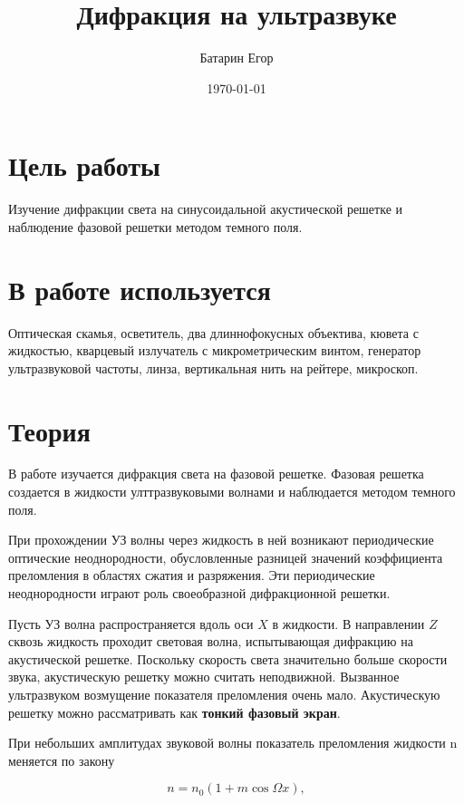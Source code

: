 \documentclass[a4paper,12pt]{article}
\author{Батарин Егор}
\title{Дифракция на ультразвуке}
\date{\today}
\begin{document}
 
\maketitle
 


\section{Цель работы} 

Изучение дифракции света на синусоидальной акустической решетке и наблюдение фазовой решетки методом темного поля. 

\section{В работе используется}

Оптическая скамья, осветитель, два длиннофокусных объектива, кювета с жидкостью, кварцевый излучатель с микрометрическим винтом, генератор ультразвуковой частоты, линза, вертикальная нить на рейтере, микроскоп. 

\section{Теория}

В работе изучается дифракция света на фазовой решетке. Фазовая решетка создается в жидкости улттразвуковыми волнами и наблюдается методом темного поля. 



При прохождении УЗ волны через жидкость в ней возникают периодические оптические неоднородности, обусловленные разницей значений коэффициента преломления в областях сжатия и разряжения. Эти периодические неоднородности играют роль своеобразной дифракционной решетки.


Пусть УЗ волна распространяется вдоль оси $X$ в жидкости. В направлении $Z$ сквозь жидкость проходит световая волна, испытывающая дифракцию на акустической решетке. Поскольку скорость света значительно больше скорости звука, акустическую решетку можно считать неподвижной. Вызванное ультразвуком возмущение показателя преломления очень мало. Акустическую решетку можно рассматривать как \textbf{тонкий фазовый экран}. 

При небольших амплитудах звуковой волны показатель преломления жидкости n меняется по закону 

\begin{equation}
n = n_0 (1 + m \cos{\Omega x}),
\label{eq2}
\end{equation}
\end{document}
